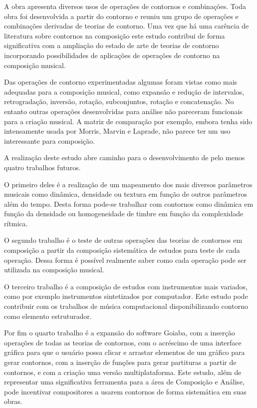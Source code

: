 A obra \obra{} apresenta diversos usos de operações de contornos e
combinações. Toda obra foi desenvolvida a partir do contorno \contpr{}
e reuniu um grupo de operações e combinações derivadas de teorias de
contorno. Uma vez que há uma carência de literatura sobre contornos na
composição este estudo contribui de forma significativa com a
ampliação do estado de arte de teorias de contorno incorporando
possibilidades de aplicações de operações de contorno na composição
musical.

Das operações de contorno experimentadas algumas foram vistas como
mais adequadas para a composição musical, como expansão e redução de
intervalos, retrogradação, inversão, rotação, subconjuntos, rotação e
concatenação. No entanto outras operações desenvolvidas para análise
não pareceram funcionais para a criação musical. A matriz de
comparação por exemplo, embora tenha sido intensamente usada por
Morris, Marvin e Laprade, não parece ter um uso interessante para
composição.

A realização deste estudo abre caminho para o desenvolvimento de pelo
menos quatro trabalhos futuros.

O primeiro deles é a realização de um mapeamento dos mais diversos
parâmetros musicais como dinâmica, densidade ou textura em função de
outros parâmetros além do tempo. Desta forma pode-se trabalhar com
contornos como dinâmica em função da densidade ou homogeneidade de
timbre em função da complexidade rítmica.

O segundo trabalho é o teste de outras operações das teorias de
contornos em composição a partir da composição sistemática de estudos
para teste de cada operação. Dessa forma é possível realmente saber
como cada operação pode ser utilizada na composição musical.

O terceiro trabalho é a composição de estudos com instrumentos mais
variados, como por exemplo instrumentos sintetizados por
computador. Este estudo pode contribuir com os trabalhos de música
computacional disponibilizando contorno como elemento estruturador.

Por fim o quarto trabalho é a expansão do software Goiaba, com a
inserção operações de todas as teorias de contornos, com o acréscimo
de uma interface gráfica para que o usuário possa clicar e arrastar
elementos de um gráfico para gerar contornos, com a inserção de
funções para gerar partituras a partir de contornos, e com a criação
uma versão multiplataforma. Este estudo, além de representar uma
significativa ferramenta para a área de Composição e Análise, pode
incentivar compositores a usarem contornos de forma sistemática em
suas obras.

